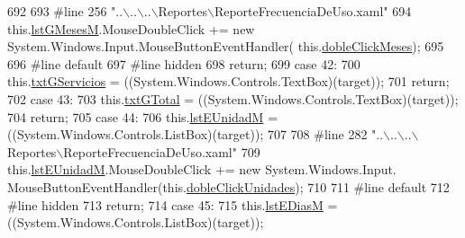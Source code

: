 \begin{DoxyCode}
692             
693 \textcolor{preprocessor}{            #line 256 "..\(\backslash\)..\(\backslash\)..\(\backslash\)Reportes\(\backslash\)ReporteFrecuenciaDeUso.xaml"}
694 \textcolor{preprocessor}{}            this.\hyperlink{class_proyecto___integrador__3_1_1_reportes_1_1_reporte_frecuencia_de_uso_a8c5a6768727a54835e71fce7e83a1392}{lstGMesesM}.MouseDoubleClick += \textcolor{keyword}{new} System.Windows.Input.MouseButtonEventHandler(
      this.\hyperlink{class_proyecto___integrador__3_1_1_reportes_1_1_reporte_frecuencia_de_uso_a50be2c40af6717361795d2ca8e9b6bf3}{dobleClickMeses});
695             
696 \textcolor{preprocessor}{            #line default}
697 \textcolor{preprocessor}{}\textcolor{preprocessor}{            #line hidden}
698 \textcolor{preprocessor}{}            \textcolor{keywordflow}{return};
699             \textcolor{keywordflow}{case} 42:
700             this.\hyperlink{class_proyecto___integrador__3_1_1_reportes_1_1_reporte_frecuencia_de_uso_a9460b0c95f1995a1b69bbedac9c7994b}{txtGServicios} = ((System.Windows.Controls.TextBox)(target));
701             \textcolor{keywordflow}{return};
702             \textcolor{keywordflow}{case} 43:
703             this.\hyperlink{class_proyecto___integrador__3_1_1_reportes_1_1_reporte_frecuencia_de_uso_ab7449cb696ced128cf9d785055ca3850}{txtGTotal} = ((System.Windows.Controls.TextBox)(target));
704             \textcolor{keywordflow}{return};
705             \textcolor{keywordflow}{case} 44:
706             this.\hyperlink{class_proyecto___integrador__3_1_1_reportes_1_1_reporte_frecuencia_de_uso_a061126bfb2b2fa1c828210ef06f6c495}{lstEUnidadM} = ((System.Windows.Controls.ListBox)(target));
707             
708 \textcolor{preprocessor}{            #line 282 "..\(\backslash\)..\(\backslash\)..\(\backslash\)Reportes\(\backslash\)ReporteFrecuenciaDeUso.xaml"}
709 \textcolor{preprocessor}{}            this.\hyperlink{class_proyecto___integrador__3_1_1_reportes_1_1_reporte_frecuencia_de_uso_a061126bfb2b2fa1c828210ef06f6c495}{lstEUnidadM}.MouseDoubleClick += \textcolor{keyword}{new} System.Windows.Input.
      MouseButtonEventHandler(this.\hyperlink{class_proyecto___integrador__3_1_1_reportes_1_1_reporte_frecuencia_de_uso_a85f2c2307781a5f965e7785e2ad097c9}{dobleClickUnidades});
710             
711 \textcolor{preprocessor}{            #line default}
712 \textcolor{preprocessor}{}\textcolor{preprocessor}{            #line hidden}
713 \textcolor{preprocessor}{}            \textcolor{keywordflow}{return};
714             \textcolor{keywordflow}{case} 45:
715             this.\hyperlink{class_proyecto___integrador__3_1_1_reportes_1_1_reporte_frecuencia_de_uso_a2b516015fab6b55141fe0b999e36e520}{lstEDiasM} = ((System.Windows.Controls.ListBox)(target));

\end{DoxyCode}
